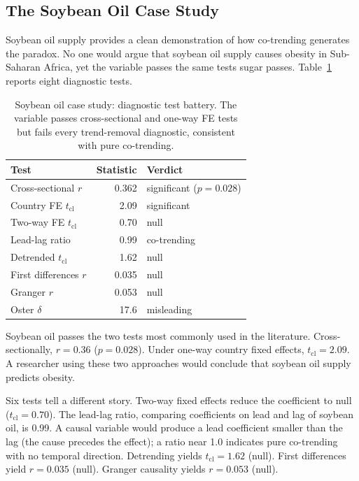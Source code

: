 \subsection{The Soybean Oil Case Study}

Soybean oil supply provides a clean demonstration of how co-trending generates the paradox. No one would argue that soybean oil supply causes obesity in Sub-Saharan Africa, yet the variable passes the same tests sugar passes. Table~\ref{tab:soybean} reports eight diagnostic tests.

\begin{table}[htbp]
\centering
\caption{Soybean oil case study: diagnostic test battery. The variable passes cross-sectional and one-way FE tests but fails every trend-removal diagnostic, consistent with pure co-trending.}
\label{tab:soybean}
\small
\begin{tabular}{lrl}
\toprule
Test & Statistic & Verdict \\
\midrule
Cross-sectional $r$ & 0.362 & significant ($p = 0.028$) \\
Country FE $t_{\text{cl}}$ & 2.09 & significant \\
Two-way FE $t_{\text{cl}}$ & 0.70 & null \\
Lead-lag ratio & 0.99 & co-trending \\
Detrended $t_{\text{cl}}$ & 1.62 & null \\
First differences $r$ & 0.035 & null \\
Granger $r$ & 0.053 & null \\
Oster $\delta$ & 17.6 & misleading \\
\bottomrule
\end{tabular}
\end{table}

Soybean oil passes the two tests most commonly used in the literature. Cross-sectionally, $r = 0.36$ ($p = 0.028$). Under one-way country fixed effects, $t_{\text{cl}} = 2.09$. A researcher using these two approaches would conclude that soybean oil supply predicts obesity.

Six tests tell a different story. Two-way fixed effects reduce the coefficient to null ($t_{\text{cl}} = 0.70$). The lead-lag ratio, comparing coefficients on lead and lag of soybean oil, is 0.99. A causal variable would produce a lead coefficient smaller than the lag (the cause precedes the effect); a ratio near 1.0 indicates pure co-trending with no temporal direction. Detrending yields $t_{\text{cl}} = 1.62$ (null). First differences yield $r = 0.035$ (null). Granger causality yields $r = 0.053$ (null).

